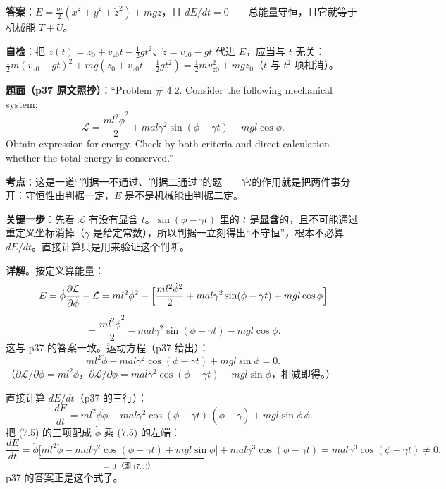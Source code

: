 \documentclass[11pt]{ctexart}
\begin{document}

\textbf{答案}：$E=\frac{m}{2}(\dot x^2+\dot y^2+\dot z^2)+mgz$，且 $dE/dt=0$——总能量守恒，且它就等于机械能 $T+U$。

\textbf{自检}：把 $z(t)=z_0+v_{z0}t-\frac12gt^2$、$\dot z=v_{z0}-gt$ 代进 $E$，应当与 $t$ 无关：$\frac12m(v_{z0}-gt)^2+mg(z_0+v_{z0}t-\frac12gt^2)=\frac12mv_{z0}^2+mgz_0$（$t$ 与 $t^2$ 项相消）。


\textbf{题面（p37 原文照抄）}：“Problem \# 4.2. Consider the following mechanical system:
\[
\mathcal{L}=\frac{ml^2\dot\phi^2}{2}+mal\gamma^2\sin(\phi-\gamma t)+mgl\cos\phi .
\]
Obtain expression for energy. Check by both criteria and direct calculation whether the total energy is conserved.”

\textbf{考点}：这是一道“判据一不通过、判据二通过”的题——它的作用就是把两件事分开：守恒性由判据一定，$E$ 是不是机械能由判据二定。

\textbf{关键一步}：先看 $\mathcal{L}$ 有没有显含 $t$。$\sin(\phi-\gamma t)$ 里的 $t$ 是\textbf{显含}的，且不可能通过重定义坐标消掉（$\gamma$ 是给定常数），所以判据一立刻得出“不守恒”，根本不必算 $dE/dt$。直接计算只是用来验证这个判断。

\textbf{详解}。按定义算能量：
\[
E=\dot\phi\frac{\partial\mathcal{L}}{\partial\dot\phi}-\mathcal{L}
=ml^2\dot\phi^2-\Bigl[\frac{ml^2\dot\phi^2}{2}+mal\gamma^2\sin(\phi-\gamma t)+mgl\cos\phi\Bigr]
\]
\[
=\frac{ml^2\dot\phi^2}{2}-mal\gamma^2\sin(\phi-\gamma t)-mgl\cos\phi . \tag{7.4}
\]
这与 p37 的答案一致。运动方程（p37 给出）：
\[
ml^2\ddot\phi-mal\gamma^2\cos(\phi-\gamma t)+mgl\sin\phi=0 . \tag{7.5}
\]
（$\partial\mathcal{L}/\partial\dot\phi=ml^2\dot\phi$，$\partial\mathcal{L}/\partial\phi=mal\gamma^2\cos(\phi-\gamma t)-mgl\sin\phi$，相减即得。）

直接计算 $dE/dt$（p37 的三行）：
\[
\frac{dE}{dt}=ml^2\dot\phi\ddot\phi-mal\gamma^2\cos(\phi-\gamma t)\,(\dot\phi-\gamma)+mgl\sin\phi\,\dot\phi .
\]
把 (7.5) 的三项配成 $\dot\phi$ 乘 (7.5) 的左端：
\[
\frac{dE}{dt}=\dot\phi\underbrace{\bigl[ml^2\ddot\phi-mal\gamma^2\cos(\phi-\gamma t)+mgl\sin\phi\bigr]}_{=\,0\ \text{（即 (7.5)）}}+mal\gamma^3\cos(\phi-\gamma t)
=mal\gamma^3\cos(\phi-\gamma t)\ne0 . \tag{7.6}
\]
p37 的答案正是这个式子。
\end{document}
